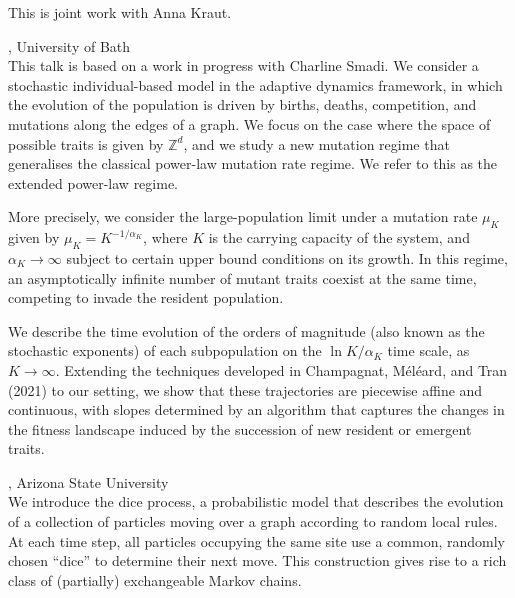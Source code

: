 \documentclass[12pt,a4paper]{article}
\begin{document}
 This is joint work with Anna Kraut. 

\bigskip\bigskip

, University of Bath \\[2ex] This talk is based on a work in progress with Charline Smadi. We consider a stochastic individual-based model in the adaptive dynamics framework, in which the evolution of the population is driven by births, deaths, competition, and mutations along the edges of a graph. We focus on the case where the space of possible traits is given by $\mathbb{Z}^d$, and we study a new mutation regime that generalises the classical power-law mutation rate regime. We refer to this as the extended power-law regime. 


 More precisely, we consider the large-population limit under a mutation rate $\mu_K$ given by $\mu_K = K^{-1/\alpha_K}$, where $K$ is the carrying capacity of the system, and $\alpha_K \to \infty$ subject to certain upper bound conditions on its growth. In this regime, an asymptotically infinite number of mutant traits coexist at the same time, competing to invade the resident population. 


 We describe the time evolution of the orders of magnitude (also known as the stochastic exponents) of each subpopulation on the $\ln K/\alpha_K$ time scale, as $K \to \infty$. Extending the techniques developed in Champagnat, Méléard, and Tran (2021) to our setting, we show that these trajectories are piecewise affine and continuous, with slopes determined by an algorithm that captures the changes in the fitness landscape induced by the succession of new resident or emergent traits. 

\bigskip\bigskip

, Arizona State University \\[2ex] We introduce the dice process, a probabilistic model that describes the evolution of a collection of particles moving over a graph according to random local rules. At each time step, all particles occupying the same site use a common, randomly chosen “dice” to determine their next move. This construction gives rise to a rich class of (partially) exchangeable Markov chains. 
\end{document}
